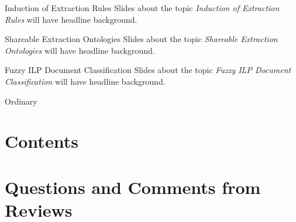 \documentclass[xcolor=dvipsnames]{beamer}
\begin{document}
\begin{frame}{Induction of Extraction Rules}
Slides about the topic \emph{Induction of Extraction Rules} will have   headline background.
\end{frame}

\begin{frame}{Shareable Extraction Ontologies}
Slides about the topic \emph{Shareable Extraction Ontologies} will have   headline background.
\end{frame}

\begin{frame}{Fuzzy ILP Document Classification}
Slides about the topic \emph{Fuzzy ILP Document Classification} will have   headline background.
\end{frame}

\resetcolor
\begin{frame}{Ordinary}
\end{frame}


\section{Contents}
\frame{\tableofcontents[currentsection]}

\section[Questions \& Comments]{Questions and Comments from Reviews} 
\frame{\tableofcontents[currentsection]}
\end{document}

